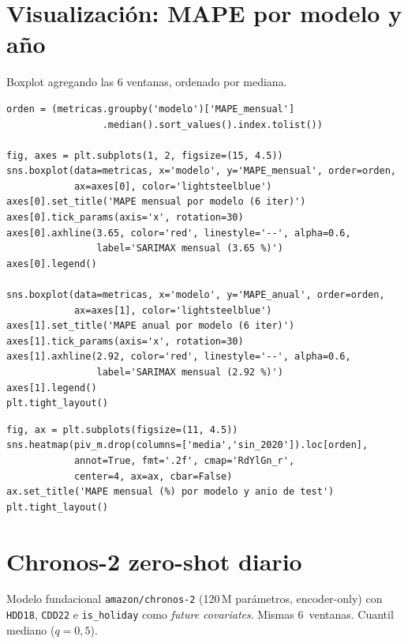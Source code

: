 \documentclass[12pt,a4paper]{article}
\begin{document}
\section{Visualización: MAPE por modelo y año}

Boxplot agregando las 6 ventanas, ordenado por mediana.

\begin{lstlisting}[caption={Boxplots de MAPE mensual y anual por modelo}]
orden = (metricas.groupby('modelo')['MAPE_mensual']
                 .median().sort_values().index.tolist())

fig, axes = plt.subplots(1, 2, figsize=(15, 4.5))
sns.boxplot(data=metricas, x='modelo', y='MAPE_mensual', order=orden,
            ax=axes[0], color='lightsteelblue')
axes[0].set_title('MAPE mensual por modelo (6 iter)')
axes[0].tick_params(axis='x', rotation=30)
axes[0].axhline(3.65, color='red', linestyle='--', alpha=0.6,
                label='SARIMAX mensual (3.65 %)')
axes[0].legend()

sns.boxplot(data=metricas, x='modelo', y='MAPE_anual', order=orden,
            ax=axes[1], color='lightsteelblue')
axes[1].set_title('MAPE anual por modelo (6 iter)')
axes[1].tick_params(axis='x', rotation=30)
axes[1].axhline(2.92, color='red', linestyle='--', alpha=0.6,
                label='SARIMAX mensual (2.92 %)')
axes[1].legend()
plt.tight_layout()
\end{lstlisting}

\begin{lstlisting}[caption={Heatmap de MAPE mensual por modelo y año}]
fig, ax = plt.subplots(figsize=(11, 4.5))
sns.heatmap(piv_m.drop(columns=['media','sin_2020']).loc[orden],
            annot=True, fmt='.2f', cmap='RdYlGn_r',
            center=4, ax=ax, cbar=False)
ax.set_title('MAPE mensual (%) por modelo y anio de test')
plt.tight_layout()
\end{lstlisting}

\section{Chronos-2 zero-shot diario}
\label{sec:chronos}

Modelo fundacional \texttt{amazon/chronos-2} (120\,M parámetros,
encoder-only) con \texttt{HDD18}, \texttt{CDD22} e \texttt{is\_holiday}
como \emph{future covariates}. Mismas 6~ventanas. Cuantil mediano
($q=0{,}5$).
\end{document}
